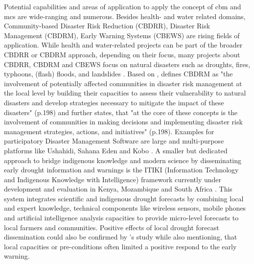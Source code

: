 Potential capabilities and areas of application to apply the concept of \acrshort{cbm} and \acrshort{mcs} are wide-ranging and numerous. Besides health- and water related domains, Community-based Disaster Risk Reduction (CBDRR), Disaster Risk Management (CBDRM), Early Warning Systems (CBEWS) are rising fields of application. While health and water-related projects can be part of the broader CBDRR or CBDRM approach, depending on their focus, many projects about CBDRR, CBDRM and CBEWS focus on natural disasters such as droughts, fires, typhoons, (flash) floods, and landslides \autocite{machereraReviewStudiesCommunity2016,manaloBellBottleTechnology2013,pinedaRedefiningCommunityBased2015,smithCommunitybasedEarlyWarning2017,tarchianiCommunityImpactBased2020,trogrlicIndigenousKnowledgeEarly2018,vhumbunuCountingDayZero2021}. Based on \textcite{unisdrUNISDRTerminologyDisaster2009}, \textcite{vhumbunuCountingDayZero2021} defines CBDRM as "the involvement of potentially affected communities in disaster risk management at the local level by building their capacities to assess their vulnerability to natural disasters and develop strategies necessary to mitigate the impact of these disasters" (p.198) and further states, that "at the core of these concepts is the involvement of communities in making decisions and implementing disaster risk management strategies, actions, and initiatives" (p.198).\newline
Examples for participatory Disaster Management Software are large and multi-purpose platforms like Ushahidi, Sahana Eden and Kobo \autocite{koboorganizationKoboToolbox,sahanafoundationSahanaEDEN2016,ushahidiCrowdsourcingSolutionsEmpower}. A smaller but dedicated approach to bridge indigenous knowledge and modern science by disseminating early drought information and warnings is the ITIKI (Information Technology and Indigenous Knowledge with Intelligence) framework currently under development and evaluation in Kenya, Mozambique and South Africa \autocite{akanbiDevelopmentRuleBasedDrought2018,masindeEffectiveDroughtEarly2014,masindeImplementationRoadmapDownscaling2013,masindeDownscalingAfricaDrought2018,masindeFrameworkPredictingDroughts2010a,masindeITIKIBridgeAfrican2012,masindeITIKIMobileBased2019,nyetanyaneIntegrationIndigenousKnowledge2020,thothelaSurveyIntelligentAgroclimate2021}. This system integrates scientific and indigenous drought forecasts by combining local and expert knowledge, technical components like wireless sensors, mobile phones and artificial intelligence analysis capacities to provide micro-level forecasts to local farmers and communities. Positive effects of local drought forecast dissemination could also be confirmed by \textcite{anderssonLocalEarlyWarning2020}'s study while also mentioning, that local capacities or pre-conditions often limited a positive respond to the early warning.\newline
